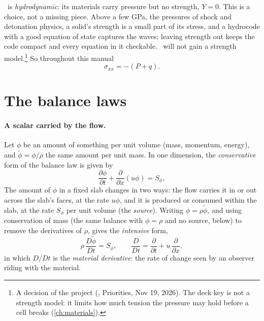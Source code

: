 \bw\ is \emph{hydrodynamic}: its materials carry pressure but no
strength, $Y = 0$. This is a choice, not a missing piece. Above a few GPa,
the pressures of shock and detonation physics, a solid's strength is a
small part of its stress, and a hydrocode with a good equation of state
captures the waves; leaving strength out keeps the code compact and every
equation in it checkable.
\bw\ will not gain a strength model.\footnote{A
decision of the project (, Priorities, Nov 19, 2026). The
deck key  is not a strength model: it limits how much
tension the pressure may hold before a cell breaks (\cref{ch:materials}).}
So throughout this manual
\begin{equation}
\sigma_{xx} = -(P + q).
\label{eq:cm-sigma}
\end{equation}

\section{The balance laws}
\label{sec:balance}

\paragraph{A scalar carried by the flow.} Let $\phi$ be an amount of
something per unit volume (mass, momentum, energy), and $\tilde\phi =
\phi/\rho$ the same amount per unit mass. In one dimension, the
\emph{conservative} form of the balance law is given by
\begin{equation}
\frac{\partial \phi}{\partial t} + \frac{\partial}{\partial x}(u\phi)
  = S_\phi,
\label{eq:cm-transport}
\end{equation}
The amount of $\phi$ in a fixed slab changes in two ways: the flow carries it in or out across the slab's faces, at the
rate $u\phi$, and it is produced or consumed within the slab, at the rate
$S_\phi$ per unit volume (the \emph{source}). Writing $\phi =
\rho\tilde\phi$, and using conservation of mass (the same balance with
$\phi = \rho$ and no source, below) to remove the derivatives of $\rho$,
gives the \emph{intensive} form,
\begin{equation}
\rho\,\frac{D\tilde\phi}{Dt} = S_\phi,
\qquad
\frac{D}{Dt} = \frac{\partial}{\partial t} + u\,\frac{\partial}{\partial x},
\label{eq:cm-intensive}
\end{equation}
in which $D/Dt$ is the \emph{material derivative}: the rate of change seen
by an observer riding with the material.

